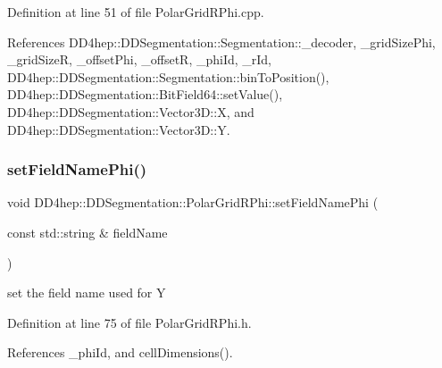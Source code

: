 Definition at line 51 of file Polar\+Grid\+R\+Phi.\+cpp.



References D\+D4hep\+::\+D\+D\+Segmentation\+::\+Segmentation\+::\+\_\+decoder, \+\_\+grid\+Size\+Phi, \+\_\+grid\+SizeR, \+\_\+offset\+Phi, \+\_\+offsetR, \+\_\+phi\+Id, \+\_\+r\+Id, D\+D4hep\+::\+D\+D\+Segmentation\+::\+Segmentation\+::bin\+To\+Position(), D\+D4hep\+::\+D\+D\+Segmentation\+::\+Bit\+Field64\+::set\+Value(), D\+D4hep\+::\+D\+D\+Segmentation\+::\+Vector3\+D\+::X, and D\+D4hep\+::\+D\+D\+Segmentation\+::\+Vector3\+D\+::Y.

\hypertarget{class_d_d4hep_1_1_d_d_segmentation_1_1_polar_grid_r_phi_ae7613ded8629daf8dc2d23160b7f3206}{}\label{class_d_d4hep_1_1_d_d_segmentation_1_1_polar_grid_r_phi_ae7613ded8629daf8dc2d23160b7f3206} 
\subsubsection{\texorpdfstring{set\+Field\+Name\+Phi()}{setFieldNamePhi()}}
{\footnotesize\ttfamily void D\+D4hep\+::\+D\+D\+Segmentation\+::\+Polar\+Grid\+R\+Phi\+::set\+Field\+Name\+Phi (\begin{DoxyParamCaption}\item[{const std\+::string \&}]{field\+Name }\end{DoxyParamCaption})\hspace{0.3cm}{\ttfamily [inline]}}



set the field name used for Y 



Definition at line 75 of file Polar\+Grid\+R\+Phi.\+h.



References \+\_\+phi\+Id, and cell\+Dimensions().

\hypertarget{class_d_d4hep_1_1_d_d_segmentation_1_1_polar_grid_r_phi_a8ea0d5863004fc7dc74a592ed631cd36}{}\label{class_d_d4hep_1_1_d_d_segmentation_1_1_polar_grid_r_phi_a8ea0d5863004fc7dc74a592ed631cd36} 
